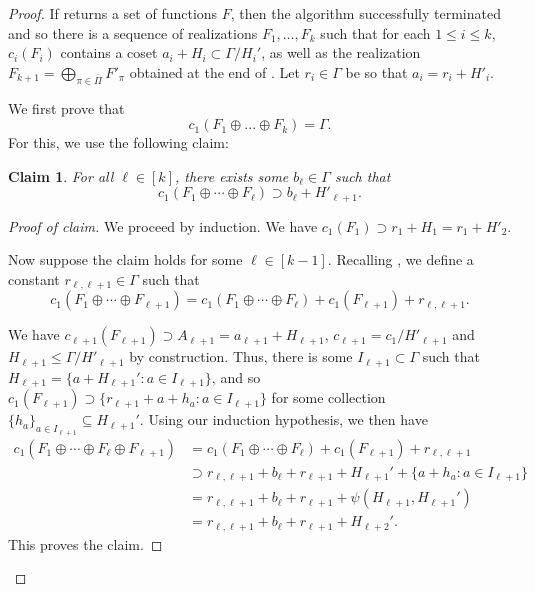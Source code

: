 \documentclass{article}
\newcommand{\se}{\subseteq}
\newtheorem*{claim*}{Claim}
\theoremstyle{definition}
\newenvironment{subproof}[1][\proofname]{%
  \renewcommand{\qedsymbol}{$\blacksquare$}%
  \begin{proof}[#1]%
}{%
  \end{proof}%
}
\begin{document}
\begin{proof}

If  returns a set of functions $F$, then the algorithm successfully terminated and so there is a sequence of realizations $F_1,\ldots,F_k$ such that for each $1\leq i\leq k$, $c_i(F_i)$ contains a coset $a_i+H_i \subset \Gamma/H_{i}'$, as well as the realization $F_{k+1}=\bigoplus_{\pi\in \overline\Pi}F'_\pi$ obtained at the end of . Let  $r_i\in \Gamma$ be so that $a_i=r_i+H'_i$.


We first prove that 
\begin{equation}\label{Fgenall}
    c_1(F_1 \oplus ... \oplus F_k) = \Gamma.
\end{equation}
For this, we use the following claim:

\begin{claim*}
For all $\ell \in [k]$, there exists some $b_\ell\in\Gamma$ such that
$$c_1(F_1\oplus\cdots \oplus F_{\ell})\supset b_\ell+H'_{\ell+1}.$$
\end{claim*}
\begin{subproof}[Proof of claim]
We proceed by induction. We have $c_1(F_1)\supset r_1+H_1=r_1+H'_2$.

Now suppose the claim holds for some $\ell \in [k-1]$. Recalling , we define a constant $r_{\ell,\ell+1}\in \Gamma$ such that 
$$c_1(F_1\oplus \cdots \oplus F_{\ell+1}) = c_1(F_1\oplus \cdots \oplus F_\ell) + c_1(F_{\ell+1}) + r_{\ell,\ell+1}.$$

We have $c_{\ell+1}(F_{\ell+1})\supset A_{\ell+1}=a_{\ell+1} + H_{\ell+1}$, $c_{\ell+1}=c_1/H'_{\ell+1}$ and $H_{\ell+1}\leqslant \Gamma/H'_{\ell+1}$ by construction. Thus, there is some $I_{\ell+1}\subset \Gamma$ such that $H_{\ell+1} = \{a+H_{\ell+1}':a\in I_{\ell+1}\}$, and so $c_{1}(F_{\ell+1})\supset \{r_{\ell+1}+a+h_a:a\in I_{\ell+1}\}$ for some collection $\{h_a\}_{a \in I_{\ell+1}}\se H_{\ell+1}'$. Using our induction hypothesis, we then have
$$\begin{aligned}
    c_1(F_1\oplus\cdots \oplus F_\ell\oplus F_{\ell+1})&=c_1(F_1\oplus \cdots \oplus F_\ell) + c_1(F_{\ell+1}) + r_{\ell,\ell+1}\\
    &\supset r_{\ell,\ell+1} +b_\ell  + r_{\ell+1} + H_{\ell+1}'+ \{a+h_a:a\in I_{\ell+1}\}\\
    & = r_{\ell,\ell+1} +b_\ell + r_{\ell+1} + \psi(H_{\ell+1},H_{\ell+1}')\\
    &=r_{\ell, \ell+1} +b_\ell + r_{\ell+1} + H_{\ell+2}'.
\end{aligned}$$ 
This proves the claim.
\end{subproof}


\end{proof}
\end{document}
